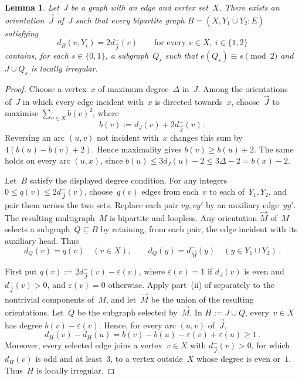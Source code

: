 \documentclass[12pt,reqno,a4paper]{amsart}
\newtheorem{lemma}[theorem]{Lemma}
\begin{document}
\begin{lemma}\label{lem:general-core}
  Let~$J$ be a graph with an edge and vertex set~$X$.
  There exists an orientation~$\vec J$ of~$J$ such that every bipartite graph
  $B=(X,Y_1\mathbin{\dot\cup}Y_2; E)$ satisfying
  \[
    d_B(v,Y_i) = 2d^-_{\vec J}(v) 
        \qquad \text{for every } v \in X,\ i \in \{1,2\}
  \]
  contains, for each $s \in \{0,1\}$, a subgraph~$Q_s$ such that $e(Q_s) \equiv
  s \pmod 2$ and $J \cup Q_s$ is locally irregular.
\end{lemma}
\begin{proof}
  Choose a vertex~$x$ of maximum degree~$\Delta$ in~$J$. 
  Among the orientations of~$J$ in which every edge incident with~$x$ is
  directed towards~$x$, choose~$\vec J$ to maximise $\sum_{v \in X} b(v)^2$,
  where
  \[
    b(v) := d_J(v) + 2d^-_{\vec J}(v) \, .
  \]
  Reversing an arc $(u,v)$ not incident with~$x$ changes this sum by
  $4(b(u)-b(v)+2)$.
  Hence maximality gives $b(v) \ge b(u) + 2$.
  The same holds on every arc $(u,x)$, since $b(u) \le 3d_J(u) - 2 \le 3\Delta
  - 2 = b(x)-2$.

  Let~$B$ satisfy the displayed degree condition. 
  For any integers $0 \le q(v) \le 2d^-_{\vec J}(v)$, choose~$q(v)$ edges from
  each~$v$ to each of~$Y_1,Y_2$, and pair them across the two sets. 
  Replace each pair $vy,vy'$ by an auxiliary edge~$yy'$.
  The resulting multigraph~$M$ is bipartite and loopless. 
  Any orientation $\vec M$ of~$M$ selects a subgraph~$Q\subseteq B$ by
  retaining, from each pair, the edge incident with its auxiliary head. 
  Thus
  \[
    d_Q(v) = q(v) \quad (v \in X), \qquad
    d_Q(y) = d^-_{\vec M}(y) \quad (y \in Y_1 \cup Y_2) \, .
  \]

  First put $q(v) := 2d^-_{\vec J}(v) - \varepsilon(v)$, where $\varepsilon(v)
  = 1$ if $d_J(v)$ is even and $d^-_{\vec J}(v) > 0$, and $\varepsilon(v) = 0$
  otherwise.
  Apply part~(ii) of  separately to the nontrivial
  components of~$M$, and let~$\vec M$ be the union of the resulting
  orientations.
  Let~$Q$ be the subgraph selected by~$\vec M$.
  In $H := J \cup Q$, every~$v \in X$ has degree $b(v) - \varepsilon(v)$.
  Hence, for every arc $(u,v)$ of~$\vec J$,
  \[
    d_H(v) - d_H(u)
      =b(v) - b(u) - \varepsilon(v) + \varepsilon(u) \ge 1 \, .
  \]
  Moreover, every selected edge joins a vertex~$v \in X$ with $d^-_{\vec J}(v)
  > 0$, for which $d_H(v)$ is odd and at least~$3$, to a vertex outside~$X$
  whose degree is even or~$1$.
  Thus~$H$ is locally irregular.


\end{proof}
\end{document}
